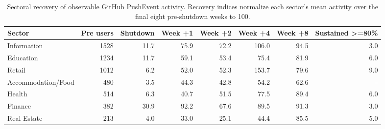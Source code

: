 \begin{table}
\caption{Sectoral recovery of observable GitHub PushEvent activity. Recovery indices normalize each sector's mean activity over the final eight pre-shutdown weeks to 100.}
\label{tab:sector_recovery}
\begin{tabular}{lrrrrrrr}
\toprule
Sector & Pre users & Shutdown & Week +1 & Week +2 & Week +4 & Week +8 & Sustained >=80\% \\
\midrule
Information & 1528 & 11.7 & 75.9 & 72.2 & 106.0 & 94.5 & 3.0 \\
Education & 1234 & 11.7 & 59.1 & 53.4 & 75.4 & 81.9 & 6.0 \\
Retail & 1012 & 6.2 & 52.0 & 52.3 & 153.7 & 79.6 & 9.0 \\
Accommodation/Food & 480 & 3.5 & 44.3 & 42.8 & 54.2 & 62.6 & -- \\
Health & 514 & 6.3 & 40.7 & 51.5 & 77.5 & 89.4 & 6.0 \\
Finance & 382 & 30.9 & 92.2 & 67.6 & 89.5 & 91.3 & 3.0 \\
Real Estate & 213 & 4.0 & 33.0 & 25.1 & 44.4 & 85.5 & 5.0 \\
\bottomrule
\end{tabular}
\end{table}
